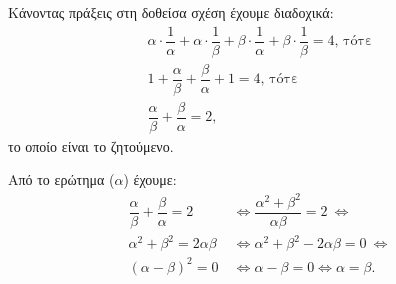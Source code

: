 
\begin{alist}
\item Κάνοντας πράξεις στη δοθείσα σχέση έχουμε διαδοχικά:
\begin{gather*}
\alpha \cdot \dfrac{1}{\alpha} + \alpha \cdot \dfrac{1}{\beta} + \beta \cdot \dfrac{1}{\alpha} + \beta \cdot \dfrac{1}{\beta} = 4\text{, τότε} \\
1 + \dfrac{\alpha}{\beta} + \dfrac{\beta}{\alpha} + 1 = 4\text{, τότε} \\
\dfrac{\alpha}{\beta} + \dfrac{\beta}{\alpha} = 2,
\end{gather*}
το οποίο είναι το ζητούμενο.

\item Από το ερώτημα ($\alpha$) έχουμε:
\begin{align*}
\dfrac{\alpha}{\beta} + \dfrac{\beta}{\alpha} = 2 \ &\Leftrightarrow
\dfrac{\alpha^2 + \beta^2}{\alpha\beta} = 2 \ \Leftrightarrow \\
\alpha^2 + \beta^2 = 2\alpha\beta \ &\Leftrightarrow
\alpha^2 + \beta^2 - 2\alpha\beta = 0 \ \Leftrightarrow \\
(\alpha - \beta)^2 = 0 \ &\Leftrightarrow 
\alpha - \beta = 0 \Leftrightarrow \alpha = \beta.
\end{align*}
\end{alist}

